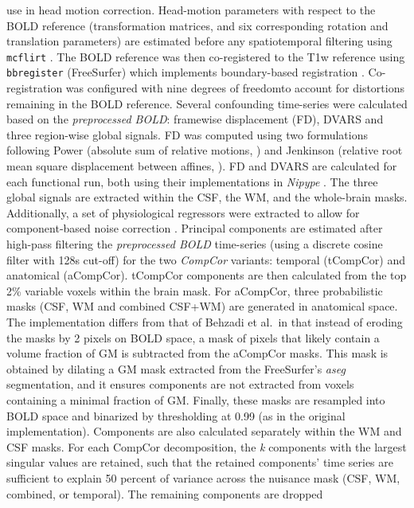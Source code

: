 \documentclass[
]{article}
\begin{document}
\begin{description}
use in head motion correction. Head-motion parameters with respect to
the BOLD reference (transformation matrices, and six corresponding
rotation and translation parameters) are estimated before any
spatiotemporal filtering using \texttt{mcflirt} \citep[FSL
,][]{mcflirt}. The BOLD reference was then co-registered to the T1w
reference using \texttt{bbregister} (FreeSurfer) which implements
boundary-based registration \citep{bbr}. Co-registration was configured
with nine degrees of freedomto account for distortions remaining in the
BOLD reference. Several confounding time-series were calculated based on
the \emph{preprocessed BOLD}: framewise displacement (FD), DVARS and
three region-wise global signals. FD was computed using two formulations
following Power (absolute sum of relative motions,
\citet{power_fd_dvars}) and Jenkinson (relative root mean square
displacement between affines, \citet{mcflirt}). FD and DVARS are
calculated for each functional run, both using their implementations in
\emph{Nipype} \citep[following the definitions by][]{power_fd_dvars}.
The three global signals are extracted within the CSF, the WM, and the
whole-brain masks. Additionally, a set of physiological regressors were
extracted to allow for component-based noise correction
\citep[\emph{CompCor},][]{compcor}. Principal components are estimated
after high-pass filtering the \emph{preprocessed BOLD} time-series
(using a discrete cosine filter with 128s cut-off) for the two
\emph{CompCor} variants: temporal (tCompCor) and anatomical (aCompCor).
tCompCor components are then calculated from the top 2\% variable voxels
within the brain mask. For aCompCor, three probabilistic masks (CSF, WM
and combined CSF+WM) are generated in anatomical space. The
implementation differs from that of Behzadi et al.~in that instead of
eroding the masks by 2 pixels on BOLD space, a mask of pixels that
likely contain a volume fraction of GM is subtracted from the aCompCor
masks. This mask is obtained by dilating a GM mask extracted from the
FreeSurfer's \emph{aseg} segmentation, and it ensures components are not
extracted from voxels containing a minimal fraction of GM. Finally,
these masks are resampled into BOLD space and binarized by thresholding
at 0.99 (as in the original implementation). Components are also
calculated separately within the WM and CSF masks. For each CompCor
decomposition, the \emph{k} components with the largest singular values
are retained, such that the retained components' time series are
sufficient to explain 50 percent of variance across the nuisance mask
(CSF, WM, combined, or temporal). The remaining components are dropped

\end{description}
\end{document}
